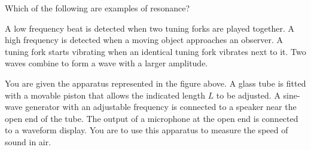\documentclass{../../../oss-ap12ibhl}
\begin{document}
\begin{questions}
    
  \question Which of the following are examples of resonance?
  \label{multi-last}
  \begin{choices}
    \choice A low frequency beat is detected when two tuning forks are played
    together.
    \choice A high frequency is detected when a moving object approaches an
    observer.
    \choice A tuning fork starts vibrating when an identical tuning fork
    vibrates next to it.
    \choice Two waves combine to form a wave with a larger amplitude.
  \end{choices}
  \newpage


  \question You are given the apparatus represented in the figure above. A
  glass tube is fitted with a movable piston that allows the indicated length
  $L$ to be adjusted. A sine-wave generator with an adjustable frequency is
  connected to a speaker near the open end of the tube. The output of a
  microphone at the open end is connected to a waveform display. You are to use
  this apparatus to measure the speed of sound in air.
\end{questions}
\end{document}
